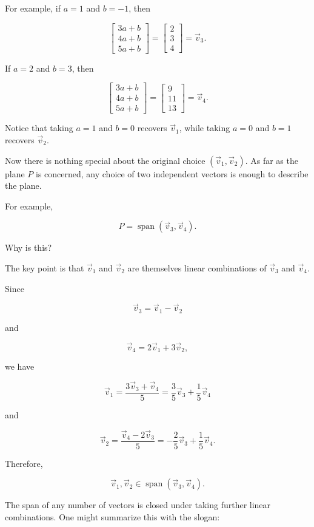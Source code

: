 For example, if $a=1$ and $b=-1$, then

\[
\begin{bmatrix}
3a+b\\
4a+b\\
5a+b
\end{bmatrix}
=
\begin{bmatrix}
2\\
3\\
4
\end{bmatrix}
=
\vec v_3.
\]

If $a=2$ and $b=3$, then

\[
\begin{bmatrix}
3a+b\\
4a+b\\
5a+b
\end{bmatrix}
=
\begin{bmatrix}
9\\
11\\
13
\end{bmatrix}
=
\vec v_4.
\]

Notice that taking $a=1$ and $b=0$ recovers $\vec v_1$, while taking $a=0$
and $b=1$ recovers $\vec v_2$.

Now there is nothing special about the original choice $(\vec v_1,\vec v_2)$.
As far as the plane $P$ is concerned, any choice of two independent vectors is
enough to describe the plane.

For example,

\[
P=\operatorname{span}(\vec v_3,\vec v_4).
\]

Why is this?

The key point is that $\vec v_1$ and $\vec v_2$ are themselves linear
combinations of $\vec v_3$ and $\vec v_4$.

Since

\[
\vec v_3=\vec v_1-\vec v_2
\]

and

\[
\vec v_4=2\vec v_1+3\vec v_2,
\]

we have

\[
\vec v_1
=
\frac{3\vec v_3+\vec v_4}{5}
=
\frac35\vec v_3+\frac15\vec v_4
\]

and

\[
\vec v_2
=
\frac{\vec v_4-2\vec v_3}{5}
=
-\frac25\vec v_3+\frac15\vec v_4.
\]

Therefore,

\[
\vec v_1,\vec v_2\in\operatorname{span}(\vec v_3,\vec v_4).
\]

The span of any number of vectors is closed under taking further linear
combinations. One might summarize this with the slogan:

